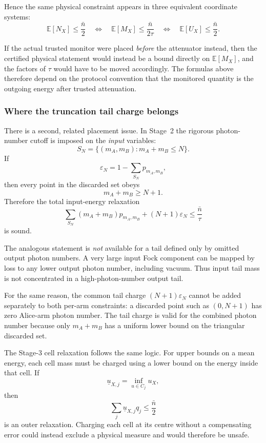 \documentclass[11pt]{article}
\theoremstyle{remark}
\begin{document}
Hence the same physical constraint appears in three equivalent coordinate
systems:
\begin{equation}
\boxed{
    \mathbb E[N_X]\le\frac{\bar n}{2}
    \quad\Longleftrightarrow\quad
    \mathbb E[M_X]\le\frac{\bar n}{2\tau}
    \quad\Longleftrightarrow\quad
    \mathbb E[U_X]\le\frac{\bar n}{2}.
}
    \label{eq:app-energy-coordinate-equivalence}
\end{equation}

If the actual trusted monitor were placed \emph{before} the attenuator instead,
then the certified physical statement would instead be a bound directly on
\(\mathbb E[M_X]\), and the factors of \(\tau\) would have to be moved
accordingly.  The formulas above therefore depend on the protocol convention
that the monitored quantity is the outgoing energy after trusted attenuation.

\subsubsection{Where the truncation tail charge belongs}

There is a second, related placement issue.  In Stage~2 the rigorous
photon-number cutoff is imposed on the \emph{input} variables:
\[
    S_N
    =
    \{(m_A,m_B):m_A+m_B\le N\}.
\]
If
\[
    \varepsilon_N
    =
    1-\sum_{S_N}p_{m_A,m_B},
\]
then every point in the discarded set obeys
\[
    m_A+m_B\ge N+1.
\]
Therefore the total input-energy relaxation
\begin{equation}
    \sum_{S_N}
    (m_A+m_B)p_{m_A,m_B}
    +(N+1)\varepsilon_N
    \le
    \frac{\bar n}{\tau}
    \label{eq:app-input-tail-energy}
\end{equation}
is sound.

The analogous statement is \emph{not} available for a tail defined only by
omitted output photon numbers.  A very large input Fock component can be
mapped by loss to any lower output photon number, including vacuum.  Thus
input tail mass is not concentrated in a high-photon-number output tail.

For the same reason, the common tail charge
\((N+1)\varepsilon_N\) cannot be added separately to both per-arm constraints:
a discarded point such as \((0,N+1)\) has zero Alice-arm photon number.  The
tail charge is valid for the combined photon number because only
\(m_A+m_B\) has a uniform lower bound on the triangular discarded set.

The Stage-3 cell relaxation follows the same logic.  For upper bounds on a
mean energy, each cell mass must be charged using a lower bound on the energy
inside that cell.  If
\[
    \underline u_{X,j}
    =
    \inf_{u\in C_j}u_X,
\]
then
\[
    \sum_j\underline u_{X,j}q_j
    \le
    \frac{\bar n}{2}
\]
is an outer relaxation.  Charging each cell at its centre without a
compensating error could instead exclude a physical measure and would therefore
be unsafe.
\end{document}
